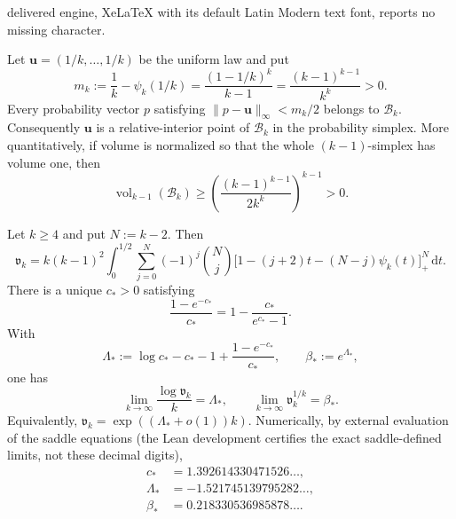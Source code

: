 \documentclass[10pt,a4paper]{amsart}
\newcommand{\body}{\mathcal{B}}
\begin{document}
delivered engine, XeLaTeX with its default Latin Modern text font, reports no missing character.
\begin{proposition}\label{prop:B-interior}
Let $\mathbf u=(1/k,\ldots,1/k)$ be the uniform law and put
\[
 m_k:=\frac1k-\psi_k(1/k)
     =\frac{(1-1/k)^k}{k-1}
     =\frac{(k-1)^{k-1}}{k^k}>0.
\]
Every probability vector $p$ satisfying
$\lVert p-\mathbf u\rVert_\infty<m_k/2$ belongs to $\body_k$.
Consequently $\mathbf u$ is a relative-interior point of $\body_k$ in the probability simplex.  More
quantitatively, if volume is normalized so that the whole $(k-1)$-simplex
has volume one, then
\begin{equation}\label{eq:B-volume-lower}
 \operatorname{vol}_{k-1}(\body_k)
 \ge \left(\frac{(k-1)^{k-1}}{2k^k}\right)^{k-1}>0.
\end{equation}
\end{proposition}

\begin{proposition}
\label{prop:B-volume-exact}
Let $k\ge4$ and put $N:=k-2$.  Then
\begin{equation}\label{eq:B-volume-exact}
 \mathfrak v_k
 =k(k-1)^2\int_0^{1/2}\sum_{j=0}^{N}(-1)^j\binom Nj
 \bigl[1-(j+2)t-(N-j)\psi_k(t)\bigr]_+^N\,\mathrm d t.
\end{equation}
There is a unique $c_*>0$ satisfying
\begin{equation}\label{eq:B-volume-saddle}
 \frac{1-e^{-c_*}}{c_*}
 =1-\frac{c_*}{e^{c_*}-1}.
\end{equation}
With
\begin{equation}\label{eq:B-volume-rate}
 \Lambda_*:=\log c_*-c_*-1+\frac{1-e^{-c_*}}{c_*},
 \qquad \beta_*:=e^{\Lambda_*},
\end{equation}
one has
\begin{equation}\label{eq:B-volume-asymptotic}
 \lim_{k\to\infty}\frac{\log\mathfrak v_k}{k}=\Lambda_*,
 \qquad
 \lim_{k\to\infty}\mathfrak v_k^{1/k}=\beta_*.
\end{equation}
Equivalently, $\mathfrak v_k=\exp((\Lambda_*+o(1))k)$.  Numerically, by
external evaluation of the saddle equations (the Lean development
certifies the exact saddle-defined limits, not these decimal digits),
\[
 \begin{aligned}
 c_*&=1.392614330471526\ldots,\\
 \Lambda_*&=-1.521745139795282\ldots,\\
 \beta_*&=0.218330536985878\ldots.
 \end{aligned}
\]
\end{proposition}
\end{document}
